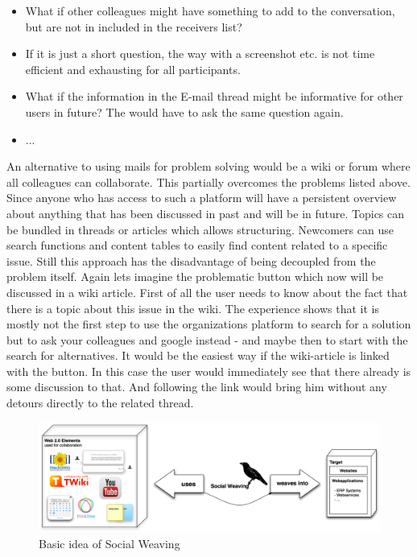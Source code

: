 \begin{itemize}
\item What if other colleagues might have something to add to the conversation, but are not in included in the receivers list? 

\item If it is just a short question, the way with a screenshot etc. is not time efficient and exhausting for all participants. 

\item What if the information in the E-mail thread might be informative for other users in future? The would have to ask the same question again. 

\item ...
\end{itemize}

An alternative to using mails for problem solving would be a wiki or forum where all colleagues can collaborate. This partially overcomes the problems listed above. Since anyone who has access to such a platform will have a persistent overview about anything that has been discussed in past and will be in future. Topics can be bundled in threads or articles which allows structuring. Newcomers can use search functions and content tables to easily  find content related to a specific issue. 
Still this approach has the disadvantage of being decoupled from the problem itself. Again lets imagine the problematic button which  now will be discussed in a wiki article. First of all the user needs to know about the fact that there is a topic about this issue in the wiki. The experience shows that it is mostly not the first step to use the organizations platform to search for a solution but to ask your colleagues and google instead - and maybe then to start with the search for alternatives.  It would be the easiest way if the wiki-article is linked with the button. In this case the user would immediately see that there already is some discussion to that. And following the link would bring him without any detours directly to the related thread.  

\begin{figure}[h!] \centering
		\includegraphics[width=13cm]{images/idead-social-weaving.png}
		\caption{Basic idea of Social Weaving}
		\label{idead-social-weaving}
\end{figure} 


